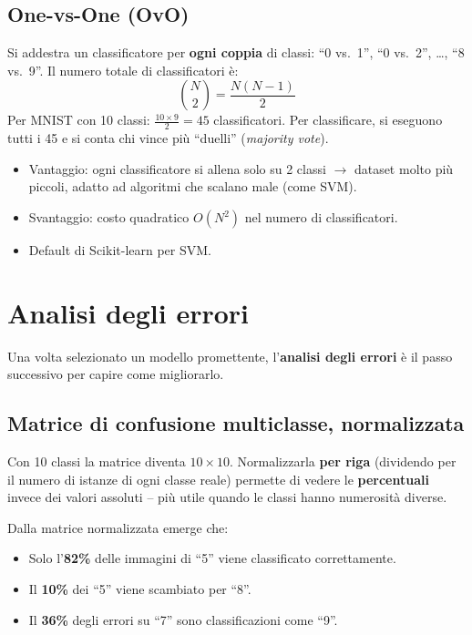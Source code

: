 \subsection{One-vs-One (OvO)}

Si addestra un classificatore per \textbf{ogni coppia} di classi: ``0 vs.\ 1'', ``0 vs.\ 2'', \ldots, ``8 vs.\ 9''. Il numero totale di classificatori è:
\[
\binom{N}{2} = \frac{N(N-1)}{2}
\]
Per MNIST con 10 classi: $\frac{10 \times 9}{2} = 45$ classificatori. Per classificare, si eseguono tutti i 45 e si conta chi vince più ``duelli'' (\emph{majority vote}).

\begin{itemize}
    \item Vantaggio: ogni classificatore si allena solo su 2 classi $\to$ dataset molto più piccoli, adatto ad algoritmi che scalano male (come SVM).
    \item Svantaggio: costo quadratico $O(N^2)$ nel numero di classificatori.
    \item Default di Scikit-learn per SVM.
\end{itemize}


\section{Analisi degli errori}
Una volta selezionato un modello promettente, l'\textbf{analisi degli errori} è il passo successivo per capire come migliorarlo.

\subsection{Matrice di confusione multiclasse, normalizzata}

Con 10 classi la matrice diventa $10 \times 10$. Normalizzarla \textbf{per riga} (dividendo per il numero di istanze di ogni classe reale) permette di vedere le \textbf{percentuali} invece dei valori assoluti -- più utile quando le classi hanno numerosità diverse.

\begin{exbox}
Dalla matrice normalizzata emerge che:
\begin{itemize}
    \item Solo l'\textbf{82\%} delle immagini di ``5'' viene classificato correttamente.
    \item Il \textbf{10\%} dei ``5'' viene scambiato per ``8''.
    \item Il \textbf{36\%} degli errori su ``7'' sono classificazioni come ``9''.
\end{itemize}
\end{exbox}

